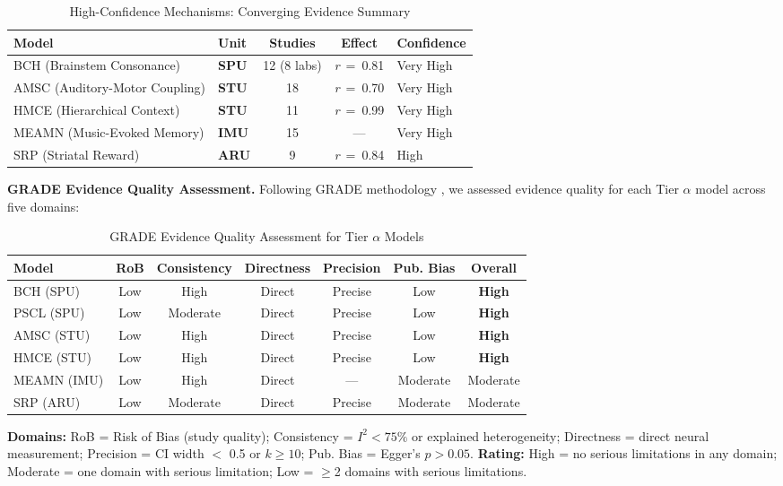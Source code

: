\documentclass[9pt,onecolumn]{article}
\newcommand{\STU}{\textcolor{stucolor}{\textbf{STU}}}
\newcommand{\IMU}{\textcolor{imucolor}{\textbf{IMU}}}
\newcommand{\SPU}{\textcolor{spucolor}{\textbf{SPU}}}
\newcommand{\ARU}{\textcolor{arucolor}{\textbf{ARU}}}
\newcommand{\correlation}[1]{\textit{r}~=~#1}
\begin{document}
\begin{table}[H]
\centering
\caption{High-Confidence Mechanisms: Converging Evidence Summary}
\label{tab:highconf}
\small
\begin{tabular}{@{}llccl@{}}
\toprule
\textbf{Model} & \textbf{Unit} & \textbf{Studies} & \textbf{Effect} & \textbf{Confidence} \\
\midrule
BCH (Brainstem Consonance) & \SPU{} & 12 (8 labs) & \correlation{0.81} & Very High \\
AMSC (Auditory-Motor Coupling) & \STU{} & 18 & \correlation{0.70} & Very High \\
HMCE (Hierarchical Context) & \STU{} & 11 & \correlation{0.99} & Very High \\
MEAMN (Music-Evoked Memory) & \IMU{} & 15 & --- & Very High \\
SRP (Striatal Reward) & \ARU{} & 9 & \correlation{0.84} & High \\
\bottomrule
\end{tabular}
\end{table}

\textbf{GRADE Evidence Quality Assessment.} Following GRADE methodology \citep{borenstein2021}, we assessed evidence quality for each Tier $\alpha$ model across five domains:

\begin{table}[H]
\centering
\caption{GRADE Evidence Quality Assessment for Tier $\alpha$ Models}
\label{tab:grade}
\scriptsize
\begin{tabular}{@{}lcccccc@{}}
\toprule
\textbf{Model} & \textbf{RoB} & \textbf{Consistency} & \textbf{Directness} & \textbf{Precision} & \textbf{Pub. Bias} & \textbf{Overall} \\
\midrule
BCH (SPU) & Low & High & Direct & Precise & Low & \cellcolor{green!20}\textbf{High} \\
PSCL (SPU) & Low & Moderate & Direct & Precise & Low & \cellcolor{green!20}\textbf{High} \\
AMSC (STU) & Low & High & Direct & Precise & Low & \cellcolor{green!20}\textbf{High} \\
HMCE (STU) & Low & High & Direct & Precise & Low & \cellcolor{green!20}\textbf{High} \\
MEAMN (IMU) & Low & High & Direct & --- & Moderate & \cellcolor{yellow!20}Moderate \\
SRP (ARU) & Low & Moderate & Direct & Precise & Moderate & \cellcolor{yellow!20}Moderate \\
\bottomrule
\end{tabular}

\vspace{0.3em}
{\raggedright\footnotesize
\textbf{Domains:} RoB = Risk of Bias (study quality); Consistency = $I^2 < 75\%$ or explained heterogeneity; Directness = direct neural measurement; Precision = CI width $<$ 0.5 or $k \geq 10$; Pub. Bias = Egger's $p > 0.05$. \textbf{Rating:} High = no serious limitations in any domain; Moderate = one domain with serious limitation; Low = $\geq$2 domains with serious limitations.\par}
\end{table}
\end{document}
